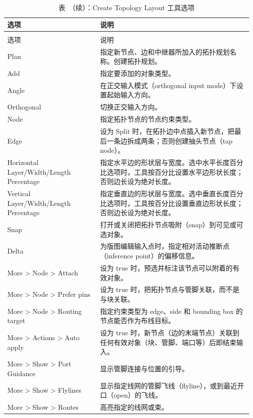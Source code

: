 \begin{longtable}{@{}>{\raggedright\arraybackslash}p{}>{\raggedright\arraybackslash}p{}@{}}
\caption{Create Topology Layout 工具选项}\label{tab:gui-dp-layout}\\
\toprule
选项 & 说明 \\
\midrule
\endfirsthead
\caption*{表~\thetable{}（续）：Create Topology Layout 工具选项}\\
\toprule
选项 & 说明 \\
\midrule
\endhead
\bottomrule
\endlastfoot
Plan & 指定新节点、边和中继器所加入的拓扑规划名称。创建拓扑规划。 \\
\addlinespace
Add & 指定要添加的对象类型。 \\
\addlinespace
Angle & 在正交输入模式（orthogonal input mode）下设置起始输入方向。 \\
\addlinespace
Orthogonal & 切换正交输入方向。 \\
\addlinespace
Node & 指定拓扑节点的节点约束类型。 \\
\addlinespace
Edge & 设为 Split 时，在拓扑边中点插入新节点，把最后一条边拆成两条；否则创建抽头节点（tap node）。 \\
\addlinespace
Horizontal Layer/Width/Length Percentage & 指定水平边的形状层与宽度。选中水平长度百分比选项时，工具按百分比设置水平边形状长度；否则边长设为绝对长度。 \\
\addlinespace
Vertical Layer/Width/Length Percentage & 指定垂直边的形状层与宽度。选中垂直长度百分比选项时，工具按百分比设置垂直边形状长度；否则边长设为绝对长度。 \\
\addlinespace
Snap & 打开或关闭把拓扑节点吸附（snap）到可见或可选对象。 \\
\addlinespace
Delta & 为版图编辑输入点时，指定相对活动推断点（inference point）的偏移信息。 \\
\addlinespace
More > Node > Attach & 设为 true 时，预选并标注该节点可以附着的有效对象。 \\
\addlinespace
More > Node > Prefer pins & 设为 true 时，把拓扑节点与管脚关联，而不是与块关联。 \\
\addlinespace
More > Node > Routing target & 指定约束类型为 edge、side 和 bounding box 的节点能否作为布线目标。 \\
\addlinespace
More > Actions > Auto apply & 设为 true 时，新节点（边的末端节点）关联到任何有效对象（块、管脚、端口等）后即结束输入。 \\
\addlinespace
More > Show > Port Guidance & 显示管脚连接与位置的引导。 \\
\addlinespace
More > Show > Flylines & 显示指定线网的管脚飞线（flyline），或到最近开口（open）的飞线。 \\
\addlinespace
More > Show > Routes & 高亮指定的线网或束。 \\
\end{longtable}

